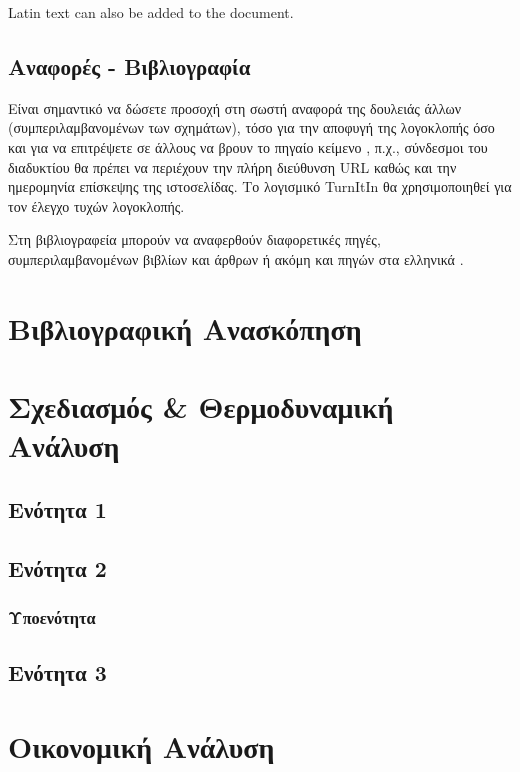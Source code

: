 \documentclass[a4paper,oneside,12pt]{book}
\begin{document}
\textlatin{Latin text can also be added to 
the document.}


\section{Αναφορές - Βιβλιογραφία}
Είναι σημαντικό να δώσετε προσοχή στη σωστή αναφορά της δουλειάς άλλων (συμπεριλαμβανομένων των σχημάτων), τόσο για την αποφυγή της λογοκλοπής όσο και για να επιτρέψετε σε άλλους να βρουν το πηγαίο κείμενο \cite{blackholes}, π.χ., σύνδεσμοι του διαδυκτίου θα πρέπει να περιέχουν την πλήρη διεύθυνση \textlatin{URL} καθώς και την ημερομηνία επίσκεψης της ιστοσελίδας. Το λογισμικό \textlatin{TurnItIn} θα χρησιμοποιηθεί για τον έλεγχο τυχών λογοκλοπής.

Στη βιβλιογραφεία μπορούν να αναφερθούν διαφορετικές πηγές, συμπεριλαμβανομένων βιβλίων \cite{book:goossens93} και άρθρων \cite{art:AbedonHymanThomas2003,art:greenwade93,proc:Abedon1994} ή ακόμη και πηγών στα ελληνικά \cite{KRitos2021}.



\chapter{Βιβλιογραφική Ανασκόπηση}


\chapter{Σχεδιασμός \& Θερμοδυναμική Ανάλυση }
\section{Ενότητα 1}

\section{Ενότητα 2}
\subsection{Υποενότητα}

\section{Ενότητα 3}

\chapter{Οικονομική Ανάλυση}
\end{document}

